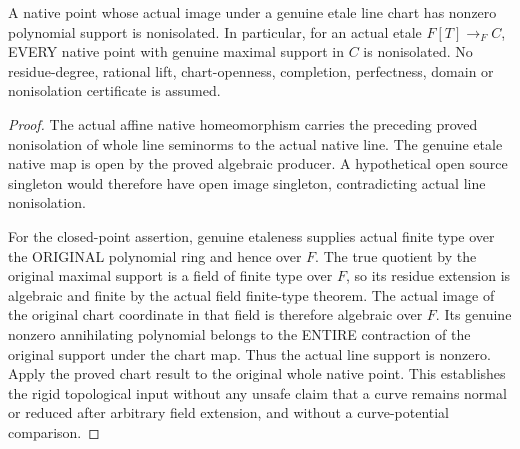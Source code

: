 \begin{theorem}
\label{scheme:actual-rigid-etale-line-chart-nonisolation}
\leanok
{}
A native point whose actual image under a genuine etale line chart
has nonzero polynomial support is nonisolated. In particular, for
an actual etale $F[T]\to_F C$, EVERY native point with genuine
maximal support in $C$ is nonisolated. No residue-degree, rational
lift, chart-openness, completion, perfectness, domain or
nonisolation certificate is assumed.
\end{theorem}
\begin{proof}
The actual affine native homeomorphism carries the preceding proved
nonisolation of whole line seminorms to the actual native line.
The genuine etale native map is open by the proved algebraic
producer. A hypothetical open source singleton would therefore
have open image singleton, contradicting actual line nonisolation.

For the closed-point assertion, genuine etaleness supplies actual
finite type over the ORIGINAL polynomial ring and hence over $F$.
The true quotient by the original maximal support is a field of
finite type over $F$, so its residue extension is algebraic and
finite by the actual field finite-type theorem. The actual image
of the original chart coordinate in that field is therefore
algebraic over $F$. Its genuine nonzero annihilating polynomial
belongs to the ENTIRE contraction of the original support under
the chart map. Thus the actual line support is nonzero. Apply the
proved chart result to the original whole native point. This
establishes the rigid topological input without any unsafe claim
that a curve remains normal or reduced after arbitrary field
extension, and without a curve-potential comparison.
\end{proof}
